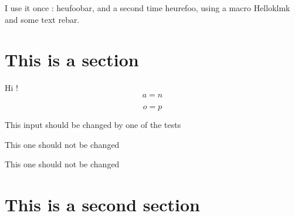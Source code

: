 \documentclass{article}
\newcommand{\MyMacro}[2]{First \emph{#1} and second {\it #2}}
\newcommand{\SecondMacro}{Hello}
\renewcommand{\MyMacro}{heu}
\begin{document}
I use it once : \MyMacro{foo}{bar}, 
and a second time  \MyMacro {refoo, using a macro 
	\SecondMacro{klmk} and some text}
	{rebar}.

\section{This is a section}
\label{SecUne}

Hi !
\begin{equation}		\label{Eqan}
	a=n
\end{equation}

\begin{equation}	\label{Eqop}
	o=p
\end{equation}


This input should be changed by one of the tests

This one should not be changed


This one should not be changed


\section{This is a second section}
\label{SecDeux}
\end{document}
